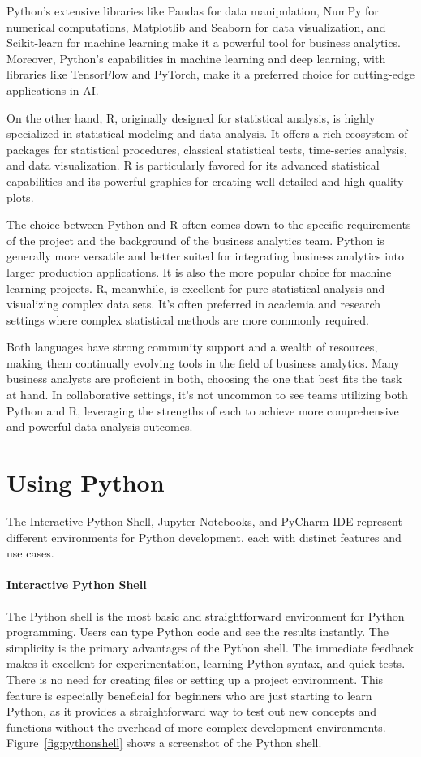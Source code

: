 Python's extensive libraries like Pandas for data manipulation, NumPy for numerical computations, Matplotlib and Seaborn for data visualization, and Scikit-learn for machine learning make it a powerful tool for business analytics. Moreover, Python's capabilities in machine learning and deep learning, with libraries like TensorFlow and PyTorch, make it a preferred choice for cutting-edge applications in AI.

On the other hand, R, originally designed for statistical analysis, is highly specialized in statistical modeling and data analysis. It offers a rich ecosystem of packages for statistical procedures, classical statistical tests, time-series analysis, and data visualization. R is particularly favored for its advanced statistical capabilities and its powerful graphics for creating well-detailed and high-quality plots.

The choice between Python and R often comes down to the specific requirements of the project and the background of the business analytics team. Python is generally more versatile and better suited for integrating business analytics into larger production applications. It is also the more popular choice for machine learning projects. R, meanwhile, is excellent for pure statistical analysis and visualizing complex data sets. It's often preferred in academia and research settings where complex statistical methods are more commonly required.

Both languages have strong community support and a wealth of resources, making them continually evolving tools in the field of business analytics. Many business analysts are proficient in both, choosing the one that best fits the task at hand. In collaborative settings, it's not uncommon to see teams utilizing both Python and R, leveraging the strengths of each to achieve more comprehensive and powerful data analysis outcomes.

\section{Using Python}

The Interactive Python Shell, Jupyter Notebooks, and PyCharm IDE represent different environments for Python development, each with distinct features and use cases.

\paragraph*{Interactive Python Shell} The Python shell is the most basic and straightforward environment for Python programming. Users can type Python code and see the results instantly. The simplicity is the primary advantages of the Python shell. The immediate feedback makes it excellent for experimentation, learning Python syntax, and quick tests. There is no need for creating files or setting up a project environment. This feature is especially beneficial for beginners who are just starting to learn Python, as it provides a straightforward way to test out new concepts and functions without the overhead of more complex development environments. Figure~\ref{fig:pythonshell} shows a screenshot of the Python shell.

